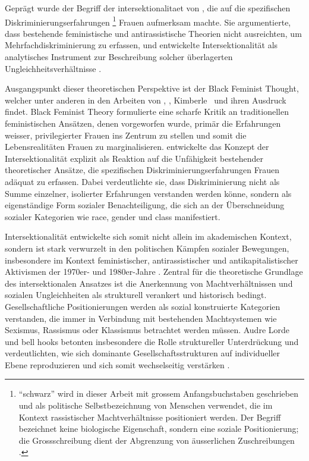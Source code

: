 Geprägt wurde der Begriff der \gls{intersektionalitaet} von \textcite{crenshawMappingMarginsIntersectionality1991}, die auf die spezifischen Diskriminierungserfahrungen \footnote{\enquote{\gls{schwarz}} wird in dieser Arbeit mit grossem Anfangsbuchstaben geschrieben und als politische Selbstbezeichnung von Menschen verwendet, die im Kontext rassistischer Machtverhältnisse positioniert werden. Der Begriff bezeichnet keine biologische Eigenschaft, sondern eine soziale Positionierung; die Grossschreibung dient der Abgrenzung von äusserlichen Zuschreibungen \parencite{oguntoyeFarbeBekennenAfrodeutsche1986}.} Frauen aufmerksam machte. Sie argumentierte, dass bestehende feministische und antirassistische Theorien nicht ausreichten, um Mehrfachdiskriminierung zu erfassen, und entwickelte Intersektionalität als analytisches Instrument zur Beschreibung solcher überlagerten Ungleichheitsverhältnisse \parencite[\gls{vgl}][]{hancockWhenMultiplicationDoesnt2007}.

Ausgangspunkt dieser theoretischen Perspektive ist der  Black Feminist Thought, welcher unter anderen in den Arbeiten von \textcite{hooksAintWomanBlack1981}, \textcite{lordeSisterOutsiderEssays1984}, Kimberle~\textcite{crenshawMappingMarginsIntersectionality1991} und \textcite{collinsBlackFeministThought2002} ihren Ausdruck findet. Black Feminist Theory formulierte eine scharfe Kritik an traditionellen feministischen Ansätzen, denen vorgeworfen wurde, primär die Erfahrungen weisser, privilegierter Frauen ins Zentrum zu stellen und somit die Lebensrealitäten  Frauen zu marginalisieren. \textcite{crenshawMappingMarginsIntersectionality1991} entwickelte das Konzept der Intersektionalität explizit als Reaktion auf die Unfähigkeit bestehender theoretischer Ansätze, die spezifischen Diskriminierungserfahrungen  Frauen adäquat zu erfassen. Dabei verdeutlichte sie, dass Diskriminierung nicht als Summe einzelner, isolierter Erfahrungen verstanden werden könne, sondern als eigenständige Form sozialer Benachteiligung, die sich an der Überschneidung sozialer Kategorien wie \gls{race}, \gls{gender} und \gls{class} manifestiert.

Intersektionalität entwickelte sich somit nicht allein im akademischen Kontext, sondern ist stark verwurzelt in den politischen Kämpfen sozialer Bewegungen, insbesondere im Kontext feministischer, antirassistischer und antikapitalistischer Aktivismen der 1970er- und 1980er-Jahre \parencite{collinsBlackFeministThought2002}. Zentral für die theoretische Grundlage des intersektionalen Ansatzes ist die Anerkennung von Machtverhältnissen und sozialen Ungleichheiten als strukturell verankert und historisch bedingt. Gesellschaftliche Positionierungen werden als sozial konstruierte Kategorien verstanden, die immer in Verbindung mit bestehenden Machtsystemen wie Sexismus, Rassismus oder Klassismus betrachtet werden müssen. Audre Lorde und bell hooks betonten insbesondere die Rolle struktureller Unterdrückung und verdeutlichten, wie sich dominante Gesellschaftsstrukturen auf individueller Ebene reproduzieren und sich somit wechselseitig verstärken \parencite{collinsBlackFeministThought2002, hancockWhenMultiplicationDoesnt2007}.

